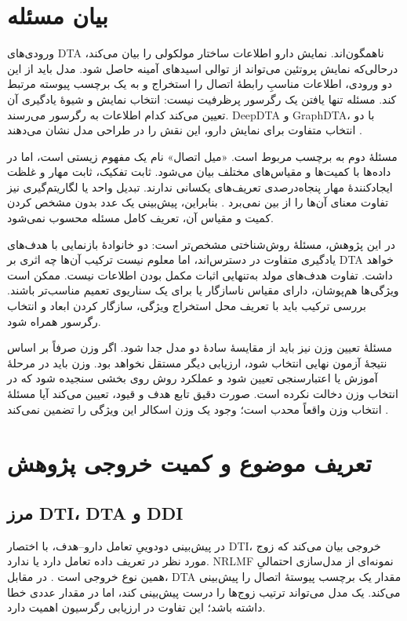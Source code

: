 \section{بیان مسئله}
\label{sec:bayan-masale}
ورودی‌های DTA ناهمگون‌اند. نمایش دارو اطلاعات ساختار مولکولی را بیان می‌کند، درحالی‌که نمایش پروتئین می‌تواند از توالی اسیدهای آمینه حاصل شود. مدل باید از این دو ورودی، اطلاعات مناسبِ رابطهٔ اتصال را استخراج و به یک برچسب پیوسته مرتبط کند. مسئله تنها یافتن یک رگرسور پرظرفیت نیست: انتخاب نمایش و شیوهٔ یادگیری آن تعیین می‌کند کدام اطلاعات به رگرسور می‌رسند. DeepDTA و GraphDTA، با دو انتخاب متفاوت برای نمایش دارو، این نقش را در طراحی مدل نشان می‌دهند \cite{Ozturk18DeepDTA,Nguyen21GraphDTA}.

مسئلهٔ دوم به برچسب مربوط است. «میل اتصال» نام یک مفهوم زیستی است، اما در داده‌ها با کمیت‌ها و مقیاس‌های مختلف بیان می‌شود. ثابت تفکیک، ثابت مهار و غلظت ایجادکنندهٔ مهار پنجاه‌درصدی تعریف‌های یکسانی ندارند. تبدیل واحد یا لگاریتم‌گیری نیز تفاوت معنای آن‌ها را از بین نمی‌برد \cite{Hulme10BindingAssays,Bento14ChEMBL}. بنابراین، پیش‌بینی یک عدد بدون مشخص کردن کمیت و مقیاس آن، تعریف کامل مسئله محسوب نمی‌شود.

در این پژوهش، مسئلهٔ روش‌شناختی مشخص‌تر است: دو خانوادهٔ بازنمایی با هدف‌های یادگیری متفاوت در دسترس‌اند، اما معلوم نیست ترکیب آن‌ها چه اثری بر DTA خواهد داشت. تفاوت هدف‌های مولد به‌تنهایی اثبات مکمل بودن اطلاعات نیست. ممکن است ویژگی‌ها هم‌پوشان، دارای مقیاس ناسازگار یا برای یک سناریوی تعمیم مناسب‌تر باشند. بررسی ترکیب باید با تعریف محل استخراج ویژگی، سازگار کردن ابعاد و انتخاب رگرسور همراه شود.

مسئلهٔ تعیین وزن نیز باید از مقایسهٔ سادهٔ دو مدل جدا شود. اگر وزن صرفاً بر اساس نتیجهٔ آزمون نهایی انتخاب شود، ارزیابی دیگر مستقل نخواهد بود. وزن باید در مرحلهٔ آموزش یا اعتبارسنجی تعیین شود و عملکرد روش روی بخشی سنجیده شود که در انتخاب وزن دخالت نکرده است. صورت دقیق تابع هدف و قیود، تعیین می‌کند آیا مسئلهٔ انتخاب وزن واقعاً محدب است؛ وجود یک وزن اسکالر این ویژگی را تضمین نمی‌کند \cite{Boyd04ConvexOptimization}.

\section{تعریف موضوع و کمیت خروجی پژوهش}
\label{sec:dta}
\subsection{مرز DTI، DTA و DDI}
در پیش‌بینی دودوییِ تعامل دارو--هدف، با اختصار DTI، خروجی بیان می‌کند که زوج مورد نظر در تعریف داده تعامل دارد یا ندارد. NRLMF نمونه‌ای از مدل‌سازی احتمالیِ همین نوع خروجی است \cite{Liu16NRLMF}. در مقابل، DTA مقدار یک برچسب پیوستهٔ اتصال را پیش‌بینی می‌کند. یک مدل می‌تواند ترتیب زوج‌ها را درست پیش‌بینی کند، اما در مقدار عددی خطا داشته باشد؛ این تفاوت در ارزیابی رگرسیون اهمیت دارد.

